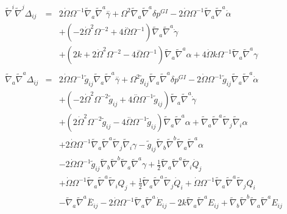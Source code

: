 \begin{eqnarray}
\\  \nonumber\\ 
\tilde\nabla^i\tilde\nabla^j\Delta_{ij}&=& 2 \dot{\Omega} \Omega^{-1} \tilde{\nabla}_{a}\tilde{\nabla}^{a}\overset{..}{\gamma} + \Omega^2 \tilde{\nabla}_{a}\tilde{\nabla}^{a}\delta p^{GI}{} - 2 \dot{\Omega} \Omega^{-1} \tilde{\nabla}_{a}\tilde{\nabla}^{a}\dot{\alpha} 
\nonumber\\
&&+ (-2 \dot{\Omega}^2 \Omega^{-2} + 4 \overset{..}{\Omega} \Omega^{-1}) \tilde{\nabla}_{a}\tilde{\nabla}^{a}\dot{\gamma} \nonumber \\ 
&& + (2 k + 2 \dot{\Omega}^2 \Omega^{-2} - 4 \overset{..}{\Omega} \Omega^{-1}) \tilde{\nabla}_{a}\tilde{\nabla}^{a}\alpha + 4 \dot{\Omega} k \Omega^{-1} \tilde{\nabla}_{a}\tilde{\nabla}^{a}\gamma 
\\  \nonumber\\ 
\tilde\nabla_a\tilde\nabla^a \Delta_{ij}&=& 2 \dot{\Omega} \Omega^{-1} \tilde{g}_{ij} \tilde{\nabla}_{a}\tilde{\nabla}^{a}\overset{..}{\gamma} + \Omega^2 \tilde{g}_{ij} \tilde{\nabla}_{a}\tilde{\nabla}^{a}\delta p^{GI}{} - 2 \dot{\Omega} \Omega^{-1} \tilde{g}_{ij} \tilde{\nabla}_{a}\tilde{\nabla}^{a}\dot{\alpha} \nonumber \\ 
&& + (-2 \dot{\Omega}^2 \Omega^{-2} \tilde{g}_{ij} + 4 \overset{..}{\Omega} \Omega^{-1} \tilde{g}_{ij}) \tilde{\nabla}_{a}\tilde{\nabla}^{a}\dot{\gamma} 
\nonumber\\
&&+ (2 \dot{\Omega}^2 \Omega^{-2} \tilde{g}_{ij} - 4 \overset{..}{\Omega} \Omega^{-1} \tilde{g}_{ij}) \tilde{\nabla}_{a}\tilde{\nabla}^{a}\alpha + \tilde{\nabla}_{a}\tilde{\nabla}^{a}\tilde{\nabla}_{j}\tilde{\nabla}_{i}\alpha \nonumber \\ 
&& + 2 \dot{\Omega} \Omega^{-1} \tilde{\nabla}_{a}\tilde{\nabla}^{a}\tilde{\nabla}_{j}\tilde{\nabla}_{i}\gamma -  \tilde{g}_{ij} \tilde{\nabla}_{b}\tilde{\nabla}^{b}\tilde{\nabla}_{a}\tilde{\nabla}^{a}\alpha 
\nonumber\\
&&- 2 \dot{\Omega} \Omega^{-1} \tilde{g}_{ij} \tilde{\nabla}_{b}\tilde{\nabla}^{b}\tilde{\nabla}_{a}\tilde{\nabla}^{a}\gamma +\tfrac{1}{2} \tilde{\nabla}_{a}\tilde{\nabla}^{a}\tilde{\nabla}_{i}\dot{Q}_{j} \nonumber \\ 
&& + \dot{\Omega} \Omega^{-1} \tilde{\nabla}_{a}\tilde{\nabla}^{a}\tilde{\nabla}_{i}Q_{j} + \tfrac{1}{2} \tilde{\nabla}_{a}\tilde{\nabla}^{a}\tilde{\nabla}_{j}\dot{Q}_{i} + \dot{\Omega} \Omega^{-1} \tilde{\nabla}_{a}\tilde{\nabla}^{a}\tilde{\nabla}_{j}Q_{i}
\nonumber\\
&&- \tilde{\nabla}_{a}\tilde{\nabla}^{a}\overset{..}{E}_{ij} - 2 \dot{\Omega} \Omega^{-1} \tilde{\nabla}_{a}\tilde{\nabla}^{a}\dot{E}_{ij}- 2 k \tilde{\nabla}_{a}\tilde{\nabla}^{a}E_{ij} + \tilde{\nabla}_{b}\tilde{\nabla}^{b}\tilde{\nabla}_{a}\tilde{\nabla}^{a}E_{ij}

\end{eqnarray}
